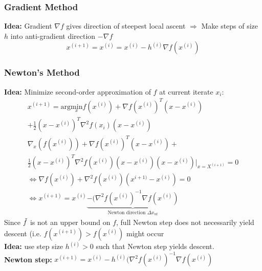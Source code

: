 \subsubsection{Gradient Method}
\textbf{Idea:} Gradient $\nabla f$ gives direction of steepest local ascent
$\Rightarrow$ Make steps of size $h$ into anti-gradient direction $-\nabla f$
\[\boxed{x^{(i+1)} = x^{(i)} = x^{(i)} - h^{(i)} \nabla f(x^{(i)})}\]
\vfill\null\columnbreak

\subsubsection{Newton's Method}
\textbf{Idea:} Minimize second-order approximation of $f$ at current iterate $x_i:$
\begin{gather*}
     x^{(i+1)} = \mathrm{arg} \underset{x}{\mathrm{min}} f(x^{(i)}) + \nabla f(x^{(i)})^T (x-x^{(i)})\\ + \frac{1}{2}(x-x^{(i)})^T\nabla^2 f(x_i)(x-x^{(i)})\\ \nabla_x (f(x^{(i)}))+\nabla f(x^{(i)})^T(x-x^{(i)}) +\\ 
     \frac{1}{2}(x-x^{(i)})^T\nabla^2 f(x^{(i)})(x-x^{(i)})(x-x^{(i)})|_{x= X^{(i+1)}} = 0\\
     \Leftrightarrow \nabla f(x^{(i)}) +\nabla^2f(x^{(i)})(x^{i+1)}-x^{(i)}) = 0\\
     \Leftrightarrow x^{(i+1)} = x^{(i)}\underbrace{-(\nabla^2f(x^{(i)})^{-1}\nabla f(x^{(i)})}_{\textrm{Newton direction }\Delta x_{nt}}
\end{gather*}
Since $\Tilde{f}$ is not an upper bound on $f$, full Newton step does not necessarily yield descent (i.e. $f(x^{(i+1)}) > f(x^{(i)})$ might occur\\
\textbf{Idea:} use step size $h^{(i)}>0$ such that Newton step yields descent. \\
\textbf{Newton step: }$\boxed{x^{(i+1)} = x^{(i)} - h^{(i)}(\nabla^2f(x^{(i)}) ^{-1}\nabla f(x^{(i)})}$
